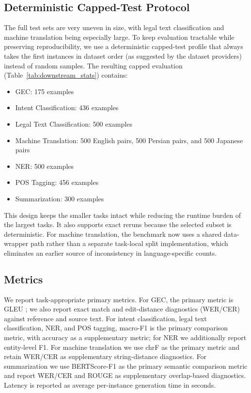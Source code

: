 \documentclass[sigconf,review,anonymous]{acmart}
\begin{document}
\subsection{Deterministic Capped-Test Protocol}
The full test sets are very uneven in size, with legal text classification and machine translation being especially large. To keep evaluation tractable while preserving reproducibility, we use a deterministic capped-test profile that always takes the first instances in dataset order (as suggested by the dataset providers) instead of random samples. The resulting capped evaluation (Table~\ref{tab:downstream_stats}) contains:
\begin{itemize}[leftmargin=1.2em]
\item GEC: 175 examples
\item Intent Classification: 436 examples
\item Legal Text Classification: 500 examples
\item Machine Translation: 500 English pairs, 500 Persian pairs, and 500 Japanese pairs
\item NER: 500 examples
\item POS Tagging: 456 examples
\item Summarization: 300 examples
\end{itemize}
This design keeps the smaller tasks intact while reducing the runtime burden of the largest tasks. It also supports exact reruns because the selected subset is deterministic. For machine translation, the benchmark now uses a shared data-wrapper path rather than a separate task-local split implementation, which eliminates an earlier source of inconsistency in language-specific counts.

\subsection{Metrics}\label{sec:metrics}
We report task-appropriate primary metrics. For GEC, the primary metric is GLEU \cite{napoles2015ground}; we also report exact match and edit-distance diagnostics (WER/CER) against reference and source text. For intent classification, legal text classification, NER, and POS tagging, macro-F1 is the primary comparison metric, with accuracy as a supplementary metric; for NER we additionally report entity-level F1. For machine translation we use chrF \cite{popovic2015chrf} as the primary metric and retain WER/CER as supplementary string-distance diagnostics. For summarization we use BERTScore-F1 \cite{zhang2019bertscore} as the primary semantic comparison metric and report WER/CER and ROUGE \cite{lin2004rouge} as supplementary overlap-based diagnostics. Latency is reported as average per-instance generation time in seconds.
\end{document}
